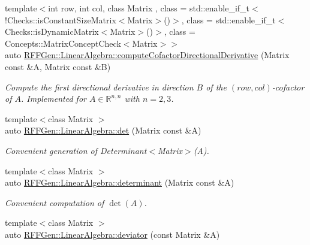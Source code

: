 \begin{DoxyCompactItemize}
{\footnotesize template$<$int row, int col, class Matrix , class  = std\-::enable\-\_\-if\-\_\-t$<$!\-Checks\-::is\-Constant\-Size\-Matrix$<$\-Matrix$>$()$>$, class  = std\-::enable\-\_\-if\-\_\-t$<$\-Checks\-::is\-Dynamic\-Matrix$<$\-Matrix$>$()$>$, class  = Concepts\-::\-Matrix\-Concept\-Check$<$\-Matrix$>$$>$ }\\auto \hyperlink{group__LinearAlgebraGroup_gae69e50e6a283915070eda9758e96aaaf}{R\-F\-F\-Gen\-::\-Linear\-Algebra\-::compute\-Cofactor\-Directional\-Derivative} (Matrix const \&A, Matrix const \&B)
\begin{DoxyCompactList}\small\item\em Compute the first directional derivative in direction $ B $ of the $(row,col)$-\/cofactor of $ A $. Implemented for $ A\in \mathbb{R}^{n,n} $ with $ n=2,3 $. \end{DoxyCompactList}\item 
\hypertarget{group__LinearAlgebraGroup_gaf7734d2f5a3026db85ddaca74322db6a}{{\footnotesize template$<$class Matrix $>$ }\\auto \hyperlink{group__LinearAlgebraGroup_gaf7734d2f5a3026db85ddaca74322db6a}{R\-F\-F\-Gen\-::\-Linear\-Algebra\-::det} (Matrix const \&A)}\label{group__LinearAlgebraGroup_gaf7734d2f5a3026db85ddaca74322db6a}

\begin{DoxyCompactList}\small\item\em Convenient generation of Determinant$<$\-Matrix$>$(\-A). \end{DoxyCompactList}\item 
\hypertarget{group__LinearAlgebraGroup_ga6cbd9a0f6299e29fae3d47c2c229c816}{{\footnotesize template$<$class Matrix $>$ }\\auto \hyperlink{group__LinearAlgebraGroup_ga6cbd9a0f6299e29fae3d47c2c229c816}{R\-F\-F\-Gen\-::\-Linear\-Algebra\-::determinant} (Matrix const \&A)}\label{group__LinearAlgebraGroup_ga6cbd9a0f6299e29fae3d47c2c229c816}

\begin{DoxyCompactList}\small\item\em Convenient computation of $\det(A)$. \end{DoxyCompactList}\item 
\hypertarget{group__LinearAlgebraGroup_ga374042eeb502ef4d59d18f11a8b55a80}{{\footnotesize template$<$class Matrix $>$ }\\auto \hyperlink{group__LinearAlgebraGroup_ga374042eeb502ef4d59d18f11a8b55a80}{R\-F\-F\-Gen\-::\-Linear\-Algebra\-::deviator} (const Matrix \&A)}\label{group__LinearAlgebraGroup_ga374042eeb502ef4d59d18f11a8b55a80}


\end{DoxyCompactItemize}
